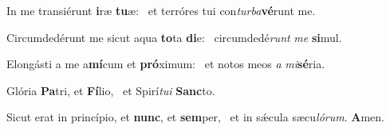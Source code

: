 \item In me transiérunt \textbf{i}ræ \textbf{tu}æ:~\psstar{} et terróres tui con\textit{turba}\textbf{vé}runt me.
\item Circumdedérunt me sicut aqua \textbf{to}ta \textbf{di}e:~\psstar{} circumdedé\textit{runt} \textit{me} \textbf{si}mul.
\item Elongásti a me a\textbf{mí}cum et \textbf{pró}ximum:~\psstar{} et notos meos \textit{a} \textit{mi}\textbf{sé}ria.
\item Glória \textbf{Pa}tri, et \textbf{Fí}lio,~\psstar{} et Spirí\textit{tui} \textbf{Sanc}to.
\item Sicut erat in princípio, et \textbf{nunc}, et \textbf{sem}per,~\psstar{} et in sǽcula sæcu\textit{lórum}. \textbf{A}men.